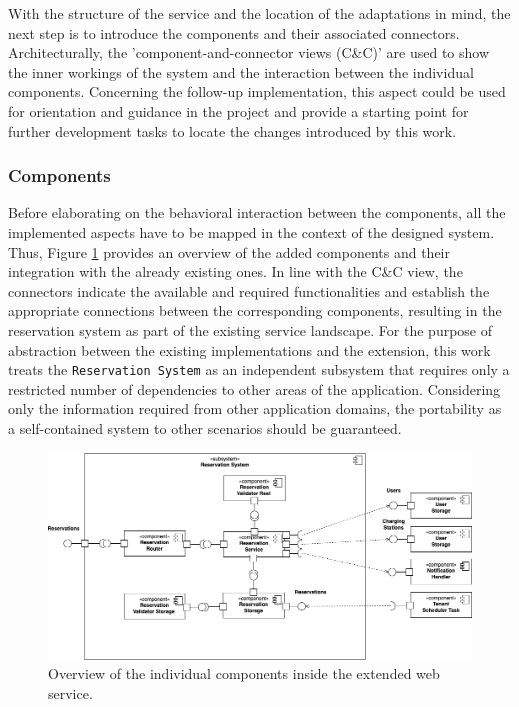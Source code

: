 \noindent With the structure of the service and the location of the adaptations in mind, the next step is to introduce the components and their associated connectors. Architecturally, the 'component-and-connector views (C\&C)' \cite[p.~136]{clements_documenting_2011} are used to show the inner workings of the system and the interaction between the individual components. 
Concerning the follow-up implementation, this aspect could be used for orientation and guidance in the project and provide a starting point for further development tasks to locate the changes introduced by this work.

\subsubsection{Components}
\label{ch:Implementation:sec:Reservation System:ssec:Architectural Views:sssec:Components}

Before elaborating on the behavioral interaction between the components, all the implemented aspects have to be mapped in the context of the designed system. Thus, Figure \ref{fig:component-view} provides an overview of the added components and their integration with the already existing ones.
In line with the C\&C view, the connectors indicate the available and required functionalities and establish the appropriate connections between the corresponding components, resulting in the reservation system as part of the existing service landscape.
For the purpose of abstraction between the existing implementations and the extension, this work treats the \texttt{Reservation System} as an independent subsystem that requires only a restricted number of dependencies to other areas of the application.
Considering only the information required from other application domains, the portability as a self-contained system to other scenarios should be guaranteed.

\begin{figure}[h]
    \centering
    \includegraphics[scale=0.4]{resources/images/main/6_implementation/ReservationComponents.png}
    \caption{Overview of the individual components inside the extended web service.}
    \label{fig:component-view}
\end{figure}

